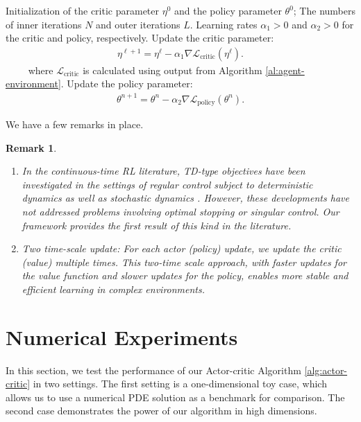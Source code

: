 \documentclass[11pt]{amsart}
\newtheorem{remark}[theorem]{Remark}
\theoremstyle{plain}
\numberwithin{equation}{section}
\begin{document}
\begin{algorithm}[h]
\caption{Actor-Critic Algorithm} \label{alg:actor-critic}
\begin{algorithmic}[1]
\State Initialization of the critic parameter $\eta^0$ and the policy parameter $\theta^0$; The numbers of inner iterations $N$ and outer iterations $L$. Learning rates $\alpha_1>0$ and $\alpha_2>0$ for the critic and policy, respectively.
\State Update the  critic parameter:
\begin{eqnarray*}
    \eta^{\ell+1} = \eta^{\ell} -\alpha_1 \nabla \mathcal{L}_{\textrm{critic}}(\eta^\ell).
\end{eqnarray*}
$\qquad$ where $\mathcal{L}_{\textrm{critic}}$ is calculated using output from Algorithm \ref{al:agent-environment}.
\State Update the policy parameter:
\begin{eqnarray*}
    \theta^{n+1} = \theta^{n} -\alpha_2 \nabla \mathcal{L}_{\textrm{policy}}(\theta^n).
\end{eqnarray*}
\EndFor
\EndFor
\end{algorithmic}
\end{algorithm}

We have a  few remarks in place.
\begin{remark} \
\begin{enumerate}
    \item In the continuous-time RL literature, TD-type objectives have been investigated in the settings of regular control subject to deterministic dynamics \cite{doya2000reinforcement} as well as stochastic dynamics \cite{jia2022policy,jia2022policy2}. However, these developments have not addressed problems involving optimal stopping or singular control. Our framework provides the first result of this kind in the literature.
    \item Two time-scale update: For each actor (policy) update, we update the critic (value) multiple times. This two-time scale approach, with faster updates for the value function and slower updates for the policy, enables more stable and efficient learning in complex environments.
\end{enumerate}
\end{remark}



\section{Numerical Experiments}\label{sec:numerics}
In this section, we test the performance of our Actor-critic Algorithm \ref{alg:actor-critic} in two settings. The first setting is a one-dimensional toy case, which allows us to use a numerical PDE solution as a benchmark for comparison. The second case demonstrates the power of our algorithm in high dimensions.
\end{document}
